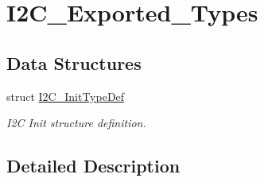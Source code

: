 \hypertarget{group___i2_c___exported___types}{}\section{I2\+C\+\_\+\+Exported\+\_\+\+Types}
\label{group___i2_c___exported___types}
\subsection*{Data Structures}
\begin{DoxyCompactItemize}
\item 
struct \mbox{\hyperlink{struct_i2_c___init_type_def}{I2\+C\+\_\+\+Init\+Type\+Def}}
\begin{DoxyCompactList}\small\item\em I2C Init structure definition. \end{DoxyCompactList}\end{DoxyCompactItemize}


\subsection{Detailed Description}
